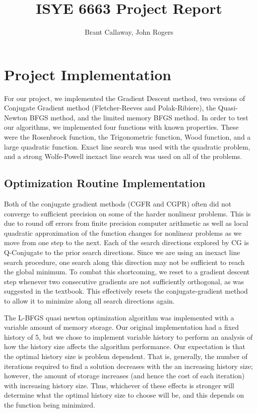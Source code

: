 \documentclass[12pt]{amsart}
\title{ISYE 6663 Project Report}
\author{Brant Callaway, John Rogers}
\date{} %
\begin{document}
\maketitle

\section{Project Implementation}
For our project, we implemented the Gradient Descent method, two versions of Conjugate Gradient method (Fletcher-Reeves and Polak-Ribiere), the Quasi-Newton BFGS method, and the limited memory BFGS method. In order to test our algorithms, we implemented four functions with known properties.  These were the Rosenbrock function, the Trigonometric function, Wood function, and a large quadratic function.  Exact line search was used with the quadratic problem, and a strong Wolfe-Powell inexact line search was used on all of the problems.  

\subsection{Optimization Routine Implementation}

Both of the conjugate gradient methods (CGFR and CGPR) often did not converge to sufficient precision on some of the harder nonlinear problems.  This is due to round off errors from finite precision computer arithmetic as well as local quadratic approximation of the function changes for nonlinear problems as we move from one step to the next.  Each of the search directions explored by CG is Q-Conjugate to the prior search directions.  Since we are using an inexact line search procedure, one search along this direction may not be sufficient to reach the global minimum.  To combat this shortcoming, we reset to a gradient descent step whenever two consecutive gradients are not sufficiently orthogonal, as was suggested in the textbook.  This effectively resets the conjugate-gradient method to allow it to minimize along all search directions again.

The L-BFGS quasi newton optimization algorithm was implemented with a variable amount of memory storage.  Our original implementation had a fixed history of 5, but we chose to implement variable history to perform an analysis of how the history size affects the algorithm performance. Our expectation is that the optimal history size is problem dependent. That is, generally, the number of iterations required to find a solution decreases with the an increasing history size; however, the amount of storage increases (and hence the cost of each iteration) with increasing history size.  Thus, whichever of these effects is stronger will determine what the optimal history size to choose will be, and this depends on the function being minimized.
\end{document}
